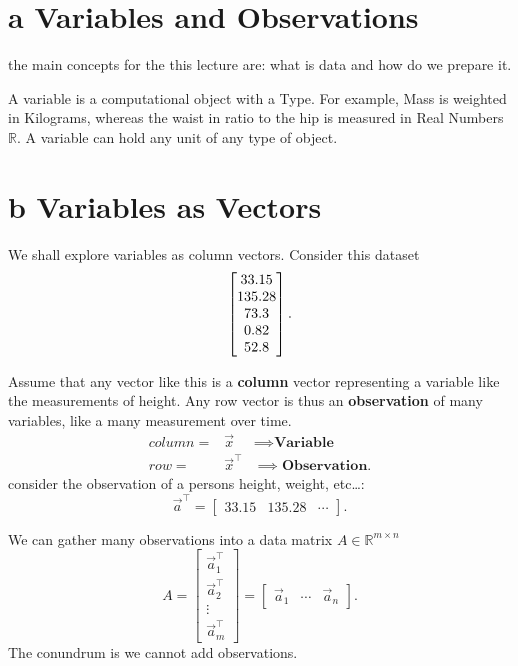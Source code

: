 \documentclass[12pt]{book}
\title{\coursetitle\linebreak\lecturename}
\author{\\Cain Susko\\ 
           \\ \\ \\
      Queen's University 
    \\School of Computing\\}
\begin{document}
\begin{titlepage}
        \maketitle
\end{titlepage}


\section*{a Variables and Observations}
the main concepts for the this lecture are: what is data and how do we prepare it.

A variable is a computational object with a Type.
For example, Mass is weighted in Kilograms, whereas the waist in ratio to the hip is measured in Real Numbers $\mathbb{R}$.
A variable can hold any unit of any type of object.

\section*{b Variables as Vectors}
We shall explore variables as column vectors.
Consider this dataset
\[
\centering
\begin{bmatrix} 
        33.15\\
        135.28\\
        73.3\\
        0.82\\
        52.8 
\end{bmatrix}  
.\] 

Assume that any vector like this is a \textbf{column} vector representing a variable like the measurements of height.
Any row vector is thus an \textbf{observation} of many variables, like a many measurement over time.
\begin{align*}
        column = &\vec x &\implies \textbf{Variable}\\
        row = &\vec x^\top &\implies \textbf{Observation}
.\end{align*}
consider the observation of a persons height, weight, etc\ldots:
\[
        \vec a^\top = \begin{bmatrix} 33.15 & 135.28 & \cdots \end{bmatrix} 
.\] 

We can gather many observations into a data matrix  $A\in \mathbb{R}^{m\times n}$ 
\[
        A = \begin{bmatrix} \vec a_1^\top \\ \vec a_2^\top \\ \vdots \\ \vec a_m^\top \end{bmatrix} = 
        \begin{bmatrix}  \vec a_1 & \cdots &\vec a_n \end{bmatrix}  
.\] 
The conundrum is we cannot add observations.
\end{document}
